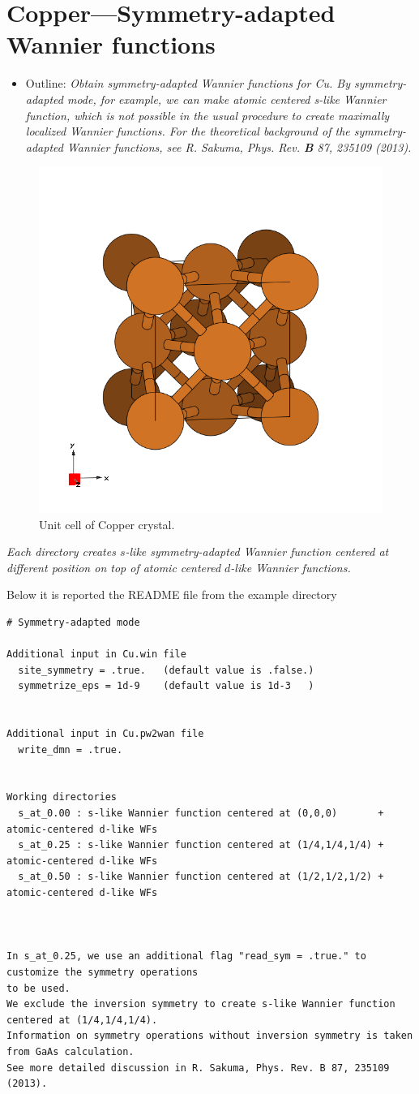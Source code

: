 \section{Copper---Symmetry-adapted Wannier functions}
\label{sec22:CopperSA}

\begin{itemize}
	\item Outline: {\it Obtain symmetry-adapted Wannier functions for Cu. By symmetry-adapted mode, for
example, we can make atomic centered s-like Wannier function, which is not possible in the usual
procedure to create maximally localized Wannier functions. For the theoretical background of the
symmetry-adapted Wannier functions, see R. Sakuma, Phys. Rev. \textbf{B} 87, 235109 (2013).}
\end{itemize}

\begin{figure}[h!]
\centering
\includegraphics[width=0.25\columnwidth,trim={45pt 45pt 55pt 55pt},clip]{figure/example04/copper_crystal.png}
\caption{Unit cell of Copper crystal.}
\label{fig22.0}
\end{figure}

{\it Each directory creates $s$-like symmetry-adapted Wannier function centered at different position on top
of atomic centered $d$-like Wannier functions.}

Below it is reported the README file from the example directory

\begin{tcolorbox}
{\footnotesize
\begin{verbatim}
# Symmetry-adapted mode

Additional input in Cu.win file
  site_symmetry = .true.   (default value is .false.)
  symmetrize_eps = 1d-9    (default value is 1d-3   )


Additional input in Cu.pw2wan file
  write_dmn = .true.


Working directories
  s_at_0.00 : s-like Wannier function centered at (0,0,0)       + atomic-centered d-like WFs
  s_at_0.25 : s-like Wannier function centered at (1/4,1/4,1/4) + atomic-centered d-like WFs
  s_at_0.50 : s-like Wannier function centered at (1/2,1/2,1/2) + atomic-centered d-like WFs



In s_at_0.25, we use an additional flag "read_sym = .true." to customize the symmetry operations
to be used.
We exclude the inversion symmetry to create s-like Wannier function centered at (1/4,1/4,1/4).
Information on symmetry operations without inversion symmetry is taken from GaAs calculation.
See more detailed discussion in R. Sakuma, Phys. Rev. B 87, 235109 (2013).
\end{verbatim}
}
\end{tcolorbox}

